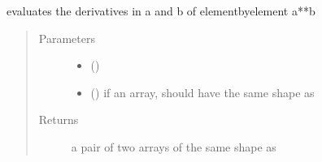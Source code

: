 \documentclass[letterpaper,10pt,english]{sphinxmanual}
\begin{document}
\begin{fulllineitems}
\label{\detokenize{ipfp_utils:ipfp_utils.der_nppow}}
evaluates the derivatives in a and b of element\sphinxhyphen{}by\sphinxhyphen{}element a**b
\begin{quote}\begin{description}
\item[{Parameters}] \leavevmode\begin{itemize}
\item {} 
 () \textendash{} 

\item {} 
\sphinxstyleliteralstrong{\sphinxupquote{, }}\sphinxstyleliteralstrong{\sphinxupquote{{]} }} (\sphinxstyleliteralemphasis{\sphinxupquote{{[}}}\sphinxstyleliteralemphasis{\sphinxupquote{,}}) \textendash{} if an array,
should have the same shape as 

\end{itemize}

\item[{Returns}] \leavevmode
a pair of two arrays of the same shape as 

\end{description}\end{quote}

\end{fulllineitems}

\end{document}

